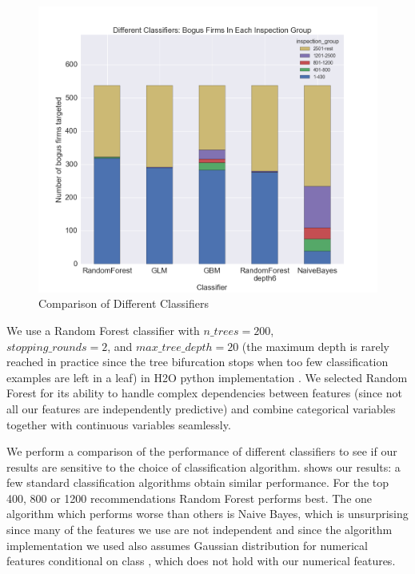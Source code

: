 \begin{figure}
  \includegraphics[width=1\columnwidth, page=1]{figures/DifferentClassifiersPerformanceByInspectionGroup.png}
  \caption{Comparison of Different Classifiers}
  \label{fig:differentclassifiers}
\end{figure}

We use a Random Forest \cite{liaw2002classification} classifier with $n\_trees=200$,\\ $stopping\_rounds=2$, and $max\_tree\_depth=20$ (the maximum depth is rarely reached in practice since the tree bifurcation stops when too few classification examples are left in a leaf) in H2O python implementation \cite{h2o_Python_module}. We selected Random Forest for its ability to handle complex dependencies between features (since not all our features are independently predictive) and combine categorical variables together with continuous variables seamlessly. 

We perform a comparison of the performance of different classifiers to see if our results are sensitive to the choice of classification algorithm.  shows our results: a few  standard classification algorithms obtain similar performance. For the top 400, 800 or 1200 recommendations Random Forest performs best. The one algorithm which performs worse than others is Naive Bayes, which is unsurprising since many of the features we use are not independent and since the algorithm implementation we used also assumes Gaussian distribution for numerical features conditional on class \cite{h2o_NaiveBayes}, which does not hold with our numerical features.

